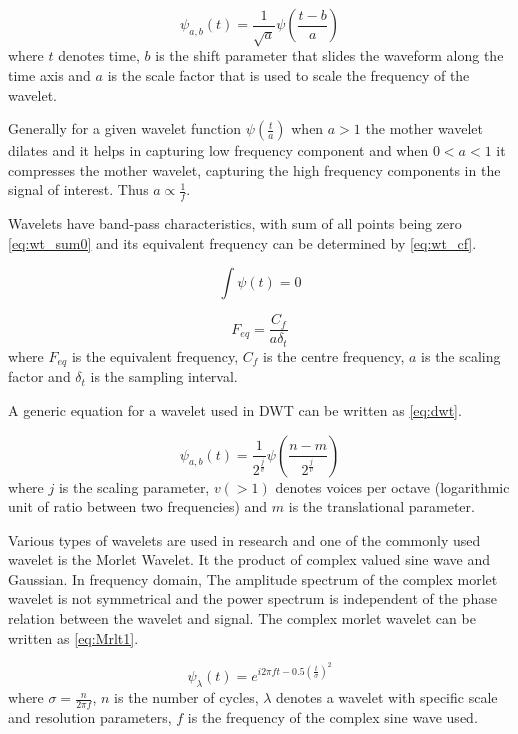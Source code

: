 \begin{equation} \label{eq:cwt}
    \psi_{a,b}(t) = \frac{1}{\sqrt{a}} \psi( \frac{t - b}{a}) 
\end{equation}
where $t$ denotes time, $b$ is the shift parameter that slides the waveform along the time axis and $a$ is the scale factor that is used to scale the frequency of the wavelet.

Generally for a given wavelet function $\psi(\frac{t}{a})$ when $a > 1$ the mother wavelet dilates and it helps in capturing low frequency component and when $0 < a < 1$ it compresses the mother wavelet, capturing the high frequency components in the signal of interest. Thus $a \propto \frac{1}{f}$.

Wavelets have band-pass characteristics, with sum of all points being zero \ref{eq:wt_sum0} and its equivalent frequency can be determined by \ref{eq:wt_cf}.

\begin{equation} \label{eq:wt_sum0}
    \int\psi(t) = 0
\end{equation}

\begin{equation} \label{eq:wt_cf}
    F_{eq} = \frac{C_f}{a\delta_t}
\end{equation}
where $F_{eq}$ is the equivalent frequency, $C_f$ is the centre frequency, $a$ is the scaling factor and $\delta_t$ is the sampling interval.

A generic equation for a wavelet used in DWT can be written as \ref{eq:dwt}.

\begin{equation} \label{eq:dwt}
    \psi_{a,b}(t) = \frac{1}{2^{\frac{j}{v}}} \psi( \frac{n - m}{2^{\frac{j}{v}}}) 
\end{equation}
where $j$ is the scaling parameter, $v(>1)$ denotes voices per octave (logarithmic unit of ratio between two frequencies) and $m$ is the translational parameter.


Various types of wavelets are used in research and one of the commonly used wavelet is the Morlet Wavelet. It the product of complex valued sine wave and Gaussian. In frequency domain, The amplitude spectrum of the complex morlet wavelet is not symmetrical and the power spectrum is independent of the phase relation between the wavelet and signal. The complex morlet wavelet can be written as \ref{eq:Mrlt1}.

\begin{equation} \label{eq:Mrlt1}
    \psi_\lambda(t) = e^{i2\pi ft -0.5(\frac{t}{\sigma})^2}
\end{equation}
where $\sigma = \frac{n}{2\pi f}$, $n$ is the number of cycles, $\lambda$ denotes a wavelet with specific scale and resolution parameters, $f$ is the frequency of the complex sine wave used.

